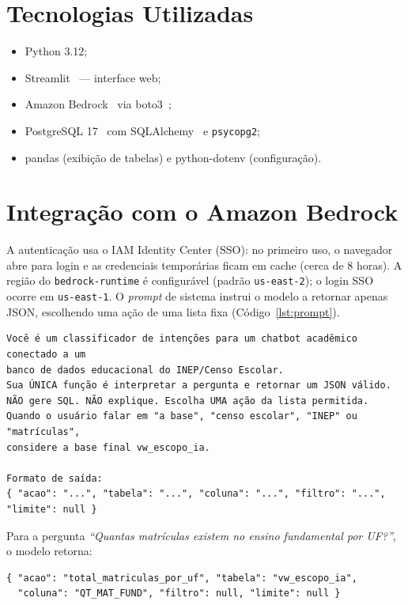 \documentclass[
    12pt,
    oneside,
    a4paper,
    chapter=TITLE,
    section=TITLE
]{abntex2}
\begin{document}
\section{Tecnologias Utilizadas}
\begin{itemize}[itemsep=1pt]
  \item Python 3.12;
  \item Streamlit~\cite{streamlit} --- interface web;
  \item Amazon Bedrock~\cite{aws_bedrock} via boto3~\cite{boto3};
  \item PostgreSQL 17~\cite{postgresql} com SQLAlchemy~\cite{sqlalchemy} e \texttt{psycopg2};
  \item pandas (exibição de tabelas) e python-dotenv (configuração).
\end{itemize}

\section{Integração com o Amazon Bedrock}
A autenticação usa o IAM Identity Center (SSO): no primeiro uso, o navegador abre para login e as
credenciais temporárias ficam em cache (cerca de 8 horas). A região do \texttt{bedrock-runtime} é
configurável (padrão \texttt{us-east-2}); o login SSO ocorre em \texttt{us-east-1}. O \textit{prompt}
de sistema instrui o modelo a retornar apenas JSON, escolhendo uma ação de uma lista fixa
(Código~\ref{lst:prompt}).

\begin{lstlisting}[caption={Trecho do prompt de sistema (classificador de intenções).}, label=lst:prompt]
Você é um classificador de intenções para um chatbot acadêmico conectado a um
banco de dados educacional do INEP/Censo Escolar.
Sua ÚNICA função é interpretar a pergunta e retornar um JSON válido.
NÃO gere SQL. NÃO explique. Escolha UMA ação da lista permitida.
Quando o usuário falar em "a base", "censo escolar", "INEP" ou "matrículas",
considere a base final vw_escopo_ia.

Formato de saída:
{ "acao": "...", "tabela": "...", "coluna": "...", "filtro": "...", "limite": null }
\end{lstlisting}

Para a pergunta \textit{``Quantas matrículas existem no ensino fundamental por UF?''}, o modelo
retorna:

\begin{lstlisting}
{ "acao": "total_matriculas_por_uf", "tabela": "vw_escopo_ia",
  "coluna": "QT_MAT_FUND", "filtro": null, "limite": null }
\end{lstlisting}
\end{document}
